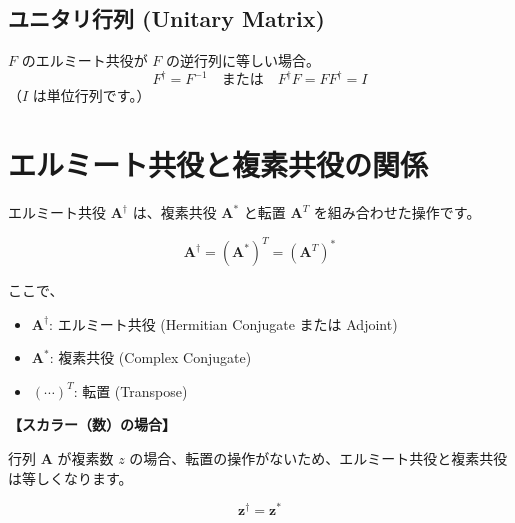 \documentclass{ltjsarticle}
\begin{document}
\subsection*{ユニタリ行列 (Unitary Matrix)}
$F$ のエルミート共役が $F$ の逆行列に等しい場合。
$$F^\dagger = F^{-1} \quad \text{または} \quad F^\dagger F = F F^\dagger = I$$
（$I$ は単位行列です。） \\




\section*{エルミート共役と複素共役の関係}

エルミート共役 $\mathbf{A}^\dagger$ は、複素共役 $\mathbf{A}^*$ と転置 $\mathbf{A}^T$ を組み合わせた操作です。

\begin{equation}
    \mathbf{A}^\dagger = (\mathbf{A}^*)^T = (\mathbf{A}^T)^*
\end{equation}

ここで、
\begin{itemize}
    \item $\mathbf{A}^\dagger$: エルミート共役 (Hermitian Conjugate または Adjoint)
    \item $\mathbf{A}^*$: 複素共役 (Complex Conjugate)
    \item $(\cdots)^T$: 転置 (Transpose)
\end{itemize}

\vspace{1em} %

\textbf{【スカラー（数）の場合】}

行列 $\mathbf{A}$ が複素数 $z$ の場合、転置の操作がないため、エルミート共役と複素共役は等しくなります。

\begin{equation}
    \mathbf{z}^\dagger = \mathbf{z}^*
\end{equation}
\end{document}
